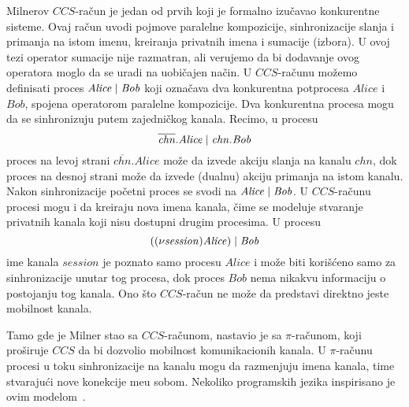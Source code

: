 Milnerov $CCS$-ra\v cun je jedan od prvih koji je formalno izu\v cavao konkurentne sisteme. Ovaj ra\v cun uvodi pojmove paralelne kompozicije, sinhronizacije slanja i primanja na istom imenu, kreiranja privatnih imena i sumacije (izbora). U ovoj tezi operator sumacije nije razmatran, ali verujemo da bi dodavanje ovog operatora moglo da se uradi na uobi\v cajen na\v cin. 
U $CCS$-ra\v cunu mo\v zemo definisati proces $\mathit{Alice} \;|\; \mathit{Bob}$ koji ozna\v cava dva konkurentna potprocesa $\mathit{Alice}$ i $\mathit{Bob}$, spojena operatorom paralelne kompozicije. Dva konkurentna procesa mogu da se sinhronizuju putem zajedni\v ckog kanala. Recimo, u procesu
\[
\overline{\mathit{chn}}.\mathit{Alice} \;|\; {\mathit{chn}}.\mathit{Bob}
\] 
proces na levoj strani $\overline{\mathit{chn}}.\mathit{Alice}$ mo\v ze da izvede akciju slanja na kanalu $\mathit{chn}$, dok proces na desnoj strani mo\v ze da izvede (dualnu) akciju primanja na istom kanalu. Nakon sinhronizacije po\v cetni proces se svodi na $\mathit{Alice} \;|\; \mathit{Bob}$.
U $CCS$-ra\v cunu procesi mogu i da kreiraju nova imena kanala, \v cime se modeluje stvaranje privatnih kanala koji nisu dostupni drugim procesima. U procesu 
\[
((\nu \mathit{session})\mathit{Alice}) \;|\; \mathit{Bob}
\]
ime kanala $\mathit{session}$ je poznato samo procesu $\mathit{Alice}$ i mo\v ze biti kori\v s\' ceno samo za sinhronizacije unutar tog procesa, dok proces $\mathit{Bob}$ nema nikakvu informaciju o postojanju tog kanala. Ono \v sto $CCS$-ra\v cun ne mo\v ze da predstavi direktno jeste mobilnost kanala. 

Tamo gde je Milner stao sa $CCS$-ra\v cunom, nastavio je sa $\pi$-ra\v cunom, koji pro\v siruje $CCS$ da bi dozvolio mobilnost komunikacionih kanala. U $\pi$-ra\v cunu procesi u toku sinhronizacije na kanalu mogu da razmenjuju imena kanala, time stvaraju\' ci nove konekcije me\dj u sobom. Nekoliko programskih jezika inspirisano je ovim modelom~\cite{ DBLP:conf/afp/FournetFMS02, DBLP:journals/entcs/MeredithR05,DBLP:conf/birthday/PierceT00,  DBLP:journals/jfp/SewellLWNAHV07, DBLP:conf/wecwis/ThiagarajanSPB02, DBLP:conf/birthday/WelchB04}. 


